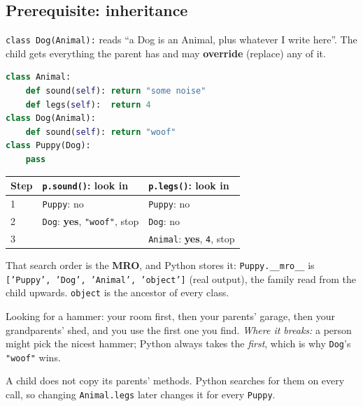 \documentclass[11pt,a4paper]{article}
\begin{document}
\subsection{Prerequisite: inheritance}
\texttt{class Dog(Animal):} reads ``a Dog is an Animal, plus whatever I write here''. The child
gets everything the parent has and may \textbf{override} (replace) any of it.
\begin{lstlisting}[language=Python]
class Animal:
    def sound(self): return "some noise"
    def legs(self):  return 4
class Dog(Animal):
    def sound(self): return "woof"
class Puppy(Dog):
    pass
\end{lstlisting}
\begin{center}
\begin{tabularx}{\textwidth}{l X X}
\toprule
\textbf{Step} & \textbf{\texttt{p.sound()}: look in} & \textbf{\texttt{p.legs()}: look in} \\
\midrule
1 & \texttt{Puppy}: no & \texttt{Puppy}: no \\
2 & \texttt{Dog}: \textbf{yes}, \texttt{"woof"}, stop & \texttt{Dog}: no \\
3 & & \texttt{Animal}: \textbf{yes}, \texttt{4}, stop \\
\bottomrule
\end{tabularx}
\end{center}
\noindent That search order is the \textbf{MRO}, and Python stores it:
\texttt{Puppy.\_\_mro\_\_} is \texttt{['Puppy', 'Dog', 'Animal', 'object']} (real output), the
family read from the child upwards. \texttt{object} is the ancestor of every class.

\begin{analogy}
Looking for a hammer: your room first, then your parents' garage, then your grandparents' shed,
and you use the first one you find. \emph{Where it breaks:} a person might pick the nicest hammer;
Python always takes the \emph{first}, which is why \texttt{Dog}'s \texttt{"woof"} wins.
\end{analogy}
\begin{caution}
A child does not copy its parents' methods. Python searches for them on every call, so changing
\texttt{Animal.legs} later changes it for every \texttt{Puppy}.
\end{caution}
\end{document}
